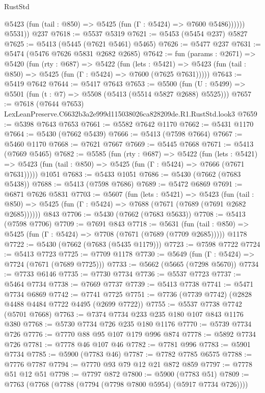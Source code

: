 \begin{lexlean}{RustStd}
\begin{coremodule}
              @5423 (fun (tail : @850) => @5425 (fun (Γ : @5424) => @7600 @5486))))))
        @5531))
    @237
@7618 := @5537 @5319
@7621 := @5453 (@5454 @237) @5827
@7625 := @5413 (@5445 (@7621 @5461) @5465)
@7626 := @5477 @237
@7631 := @5474 (@5476 @7626 @5831 @2682 @2685)
@7642 := fun (params : @2671) =>
  @5420
    (fun (rty : @687) =>
    @5422
      (fun (lets : @5421) =>
      @5423 (fun (tail : @850) => @5425 (fun (Γ : @5424) => @7600 (@7625 @7631)))))
@7643 := @5419 @7642
@7644 := @5417 @7643
@7653 := @5500 (fun (U : @5499) => @5501 (fun (t : @7) => @5508 (@5413 (@5514 @5827 @2688) @5525)))
@7657 := @7618 (@7644 @7653) LexLeanPreserve.C6632b3a2e999d115038026ca828209de.R1.RustStd.look3
@7659 := @5398 @7643 @7653
@7661 := @5582 @7642 @1170
@7662 := @5431 @1170
@7664 := @5430 (@7662 @5439)
@7666 := @5413 (@7598 @7664)
@7667 := @5460 @1170
@7668 := @7621 @7667
@7669 := @5445 @7668
@7671 := @5413 (@7669 @5465)
@7682 := @5585
    (fun (rty : @687) =>
    @5422
      (fun (lets : @5421) =>
      @5423 (fun (tail : @850) => @5425 (fun (Γ : @5424) => @7666 (@7671 @7631)))))
    @1051
@7683 := @5433 @1051
@7686 := @5430 (@7662 (@7683 @5438))
@7688 := @5413 (@7598 @7686)
@7689 := @5472 @6869
@7691 := @6871 @7626 @5831
@7703 := @5607
    (fun (lets : @5421) =>
    @5423
      (fun (tail : @850) => @5425 (fun (Γ : @5424) => @7688 (@7671 (@7689 (@7691 @2682 @2685))))))
    @843
@7706 := @5430 (@7662 (@7683 @5633))
@7708 := @5413 (@7598 @7706)
@7709 := @7691 @843
@7718 := @5631
    (fun (tail : @850) => @5425 (fun (Γ : @5424) => @7708 (@7671 (@7689 (@7709 @2685)))))
    @1178
@7722 := @5430 (@7662 (@7683 (@5435 @1179)))
@7723 := @7598 @7722
@7724 := @5413 @7723
@7725 := @7709 @1178
@7730 := @5649 (fun (Γ : @5424) => @7724 (@7671 (@7689 @7725)))
@7733 := @5662 (@5665 (@7298 @5670))
@7734 := @7733 @6146
@7735 := @7730 @7734
@7736 := @5537 @7723
@7737 := @5464 @7734
@7738 := @7669 @7737
@7739 := @5413 @7738
@7741 := @5471 @7734 @6869
@7742 := @7741 @7725
@7751 := @7736 (@7739 @7742) (@2828 @4488 @4484 @7722 @4495 (@2699 @7722))
@7755 := @5537 @7738 @7742 (@5701 @7668)
@7763 := @7374 @7734 @233 @235 @180 @107 @843 @1176 @380
@7768 := @5730 @7734 @726 @235 @180 @1176
@7770 := @5739 @7734 @726
@7776 := @7770 @88 @95 @107 @179 @996 @874
@7778 := @5892 @7734 @726
@7781 := @7778 @46 @107 @46
@7782 := @7781 @996
@7783 := @5901 @7734
@7785 := @5900 (@7783 @46)
@7787 := @7782 @7785 @6575
@7788 := @7776 @7787
@7794 := @7770 @93 @79 @12 @21 @872 @859
@7797 := @7778 @51 @12 @51
@7798 := @7797 @872
@7800 := @5900 (@7783 @51)
@7809 := @7763 (@7768 (@7788 (@7794 (@7798 @7800 @5954) (@5917 @7734 @726))))

\end{coremodule}
\end{lexlean}
